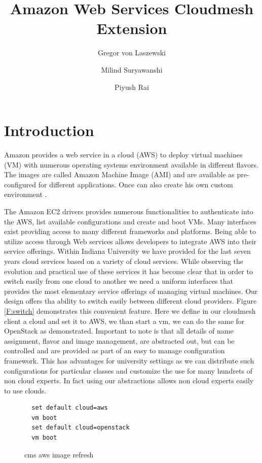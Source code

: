 \documentclass[9pt,twocolumn,twoside]{../../styles/osajnl}
\title{Amazon Web Services Cloudmesh Extension}
\author[1]{Gregor von Laszewski}
\author[1]{Milind Suryawanshi}
\author[1]{Piyush Rai}
\affil[1]{School of Informatics and Computing, Bloomington, IN 47408, U.S.A.}
\begin{document}
\maketitle

\section{Introduction}



Amazon provides a web service in a cloud (AWS) to deploy
virtual machines (VM) with numerous operating systems environment
available in different flavors. The images are called Amazon Machine
Image (AMI) and are available as pre-configured for different
applications. Once can also create his own custom environment
\cite{www-amazon-ec2}.

The Amazon EC2 drivers provides numerous functionalities to
authenticate into the AWS, list available configurations and create
and boot VMs. Many interfaces exist providing access to many different
frameworks and platforms. Being able to utilize access through Web
services allows developers to integrate AWS into their service
offerings. Within Indiana University we have provided for the last
seven years cloud services based on a variety of cloud services.
While observing the evolution and practical use of these services it
has become clear that in order to switch easily from one cloud to
another we need a uniform interfaces that provides the most elementary
service offerings of managing virtual machines. Our design offers tha
ability to switch easily between different cloud providers. Figure
\ref{F:switch} demonstrates this convenient feature. Here we define in
our cloudmesh client a cloud and set it to AWS, we than start a vm, we
can do the same for OpenStack as demonstrated. Important to note is
that all details of name assignment, flavor and image management, are
abstracted out, but can be controlled and are provided as part of an
easy to manage configuration framework. This has advantages for
university settings as we can distribute such configurations for
particular classes and customize the use for many hundrets of non
cloud experts. In fact using our abstractions allows non cloud experts
easily to use clouds. 

\begin{figure}[htb]
  \centering
  \begin{verbatim}
  set default cloud=aws
  vm boot
  set default cloud=openstack
  vm boot 
  \end{verbatim}
  \vspace{-2.0\baselineskip}
  \caption{cms aws image refresh}
  \label{fig:imagerefresh}
\end{figure}
		
\end{document}

